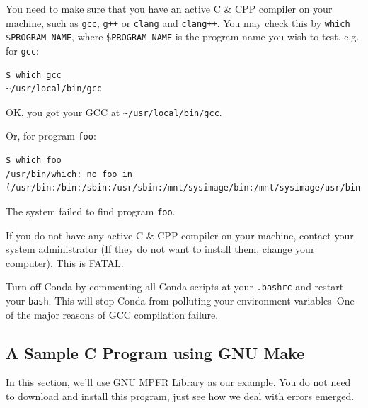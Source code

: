 \documentclass[]{article}
\begin{document}
You need to make sure that you have an active C \& CPP compiler on your machine, such as \verb|gcc|, \verb|g++| or \verb|clang| and \verb|clang++|. You may check this by \verb|which $PROGRAM_NAME|, where \verb|$PROGRAM_NAME| is the program name you wish to test. e.g. for \verb|gcc|:
\begin{verbatim}
$ which gcc
~/usr/local/bin/gcc
\end{verbatim}
OK, you got your GCC at \verb|~/usr/local/bin/gcc|.

Or, for program \verb|foo|:
\begin{verbatim}
$ which foo
/usr/bin/which: no foo in (/usr/bin:/bin:/sbin:/usr/sbin:/mnt/sysimage/bin:/mnt/sysimage/usr/bin:/mnt/sysimage/usr/sbin:/mnt/sysimage/sbin:/sbin:/usr/sbin:)
\end{verbatim}

The system failed to find program \verb|foo|.

If you do not have any active C \& CPP compiler on your machine, contact your system administrator (If they do not want to install them, change your computer). This is {\color{red}FATAL}.

Turn off Conda by commenting all Conda scripts at your \verb|.bashrc| and restart your \verb|bash|. This will stop Conda from polluting your environment variables--One of the major reasons of GCC compilation failure.

\subsection{A Sample C Program using GNU Make}

In this section, we'll use GNU MPFR Library as our example. You do not need to download and install this program, just see how we deal with errors emerged.
\end{document}

